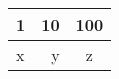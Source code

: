 \begin{longtable}[]{@{}lrc@{}}
\hline
1 & 10 & 100\tabularnewline
\hline
\endfirsthead
x & y & z\tabularnewline
\hline
\end{longtable}
